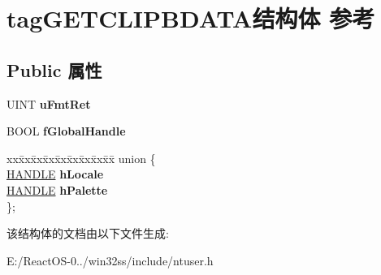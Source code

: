 \hypertarget{structtag_g_e_t_c_l_i_p_b_d_a_t_a}{}\section{tag\+G\+E\+T\+C\+L\+I\+P\+B\+D\+A\+T\+A结构体 参考}
\label{structtag_g_e_t_c_l_i_p_b_d_a_t_a}
\subsection*{Public 属性}
\begin{DoxyCompactItemize}
\item 
\mbox{\label{structtag_g_e_t_c_l_i_p_b_d_a_t_a_ae441572c411260889d03961e2dd4f20a}} 
U\+I\+NT {\bfseries u\+Fmt\+Ret}
\item 
\mbox{\label{structtag_g_e_t_c_l_i_p_b_d_a_t_a_a9eb26d5cc8eefdf2ccd0c05c2cc6ddc2}} 
B\+O\+OL {\bfseries f\+Global\+Handle}
\item 
\mbox{\label{structtag_g_e_t_c_l_i_p_b_d_a_t_a_af8c9ef7a9ec487ff34e18b3c625c3841}} 
\begin{tabbing}
xx\=xx\=xx\=xx\=xx\=xx\=xx\=xx\=xx\=\kill
union \{\\
\>\hyperlink{interfacevoid}{HANDLE} {\bfseries hLocale}\\
\>\hyperlink{interfacevoid}{HANDLE} {\bfseries hPalette}\\
\}; \\

\end{tabbing}\end{DoxyCompactItemize}


该结构体的文档由以下文件生成\+:\begin{DoxyCompactItemize}
\item 
E\+:/\+React\+O\+S-\/0../win32ss/include/ntuser.\+h\end{DoxyCompactItemize}
